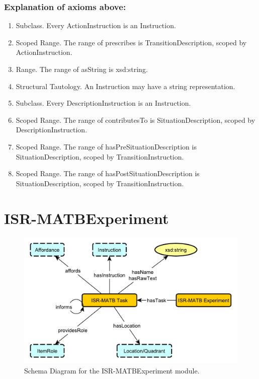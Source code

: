 \subsubsection*{Explanation of axioms above:}

\begin{enumerate}
\item Subclass. Every \textsf{ActionInstruction} is an \textsf{Instruction}.
\item Scoped Range. The range of \textsf{prescribes} is TransitionDescription, scoped by \textsf{ActionInstruction}.
\item Range. The range of \textsf{asString} is \textsf{xsd:string}.
\item Structural Tautology. An \textsf{Instruction} may have a string representation.
\item Subclass. Every \textsf{DescriptionInstruction} is an \textsf{Instruction}.
\item Scoped Range. The range of \textsf{contributesTo} is \textsf{SituationDescription}, scoped by \textsf{DescriptionInstruction}.
\item Scoped Range. The range of \textsf{hasPreSituationDescription} is \textsf{SituationDescription}, scoped by \textsf{TransitionInstruction}.
\item Scoped Range. The range of \textsf{hasPostSituationDescription} is \textsf{SituationDescription}, scoped by \textsf{TransitionInstruction}.
\end{enumerate}

\newpage
\section{ISR-MATBExperiment}
\label{ssec:isrmatbexperiment}

\begin{figure}[h!]
\begin{center}
\includegraphics[width=.8\textwidth]{resources/ISR-MATBExperiment.pdf}
\end{center}
\caption{Schema Diagram for the \textsf{ISR-MATBExperiment} module.}
\label{fig:experiment}
\end{figure}

